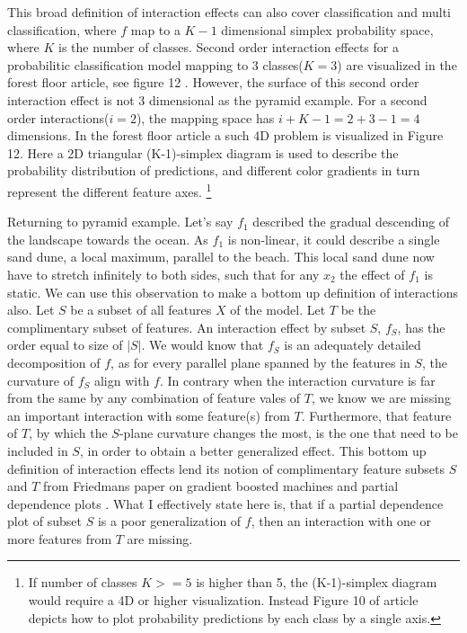 This broad definition of interaction effects can also cover classification and multi classification, where $f$ map to a $K-1$ dimensional simplex probability space, where $K$ is the number of classes. Second order interaction effects for a probabilitic classification model mapping to 3 classes($K=3$) are visualized in the forest floor article, see figure 12 \cite{welling2016forest}. However, the surface of this second order interaction effect is not 3 dimensional as the pyramid example. For a second order interactions($i=2$), the mapping space has $i+K-1=2+3-1=4$ dimensions. In the forest floor article a such 4D problem is visualized in Figure 12. Here a 2D triangular (K-1)-simplex diagram is used to describe the probability distribution of predictions, and different color gradients in turn represent the different feature axes. 
\footnote{If number of classes $K>=5$ is higher than 5, the (K-1)-simplex diagram would require a 4D or higher visualization. Instead Figure 10 of article depicts how to plot probability predictions by each class by a single axis.}

Returning to pyramid example. Let's say $f_1$ described the gradual descending of the landscape towards the ocean. As $f_1$ is non-linear, it could describe a single sand dune, a local maximum, parallel to the beach. This local sand dune now have to stretch infinitely to both sides, such that for any $x_2$ the effect of $f_1$ is static. We can use this observation to make a bottom up definition of interactions also. Let $S$ be a subset of all features $X$ of the model. Let $T$ be the complimentary subset of features. An interaction effect by subset $S$, $f_S$, has the order equal to size of $|S|$. We would know that $f_S$ is an adequately detailed decomposition of $f$, as for every parallel plane spanned by the features in $S$, the curvature of $f_S$ align with $f$. In contrary when the interaction curvature is far from the same by any combination of feature vales of $T$, we know we are missing an important interaction with some feature(s) from $T$. Furthermore, that feature of $T$, by which the $S$-plane curvature changes the most, is the one that need to be included in $S$, in order to obtain a better generalized effect. This bottom up definition of interaction effects lend its notion of complimentary feature subsets $S$ and $T$ from Friedmans paper on gradient boosted machines and partial dependence plots \cite{friedman2001greedy}. What I effectively state here is, that if a partial dependence plot of subset $S$ is a poor generalization of $f$, then an interaction with one or more features from $T$ are missing. 

